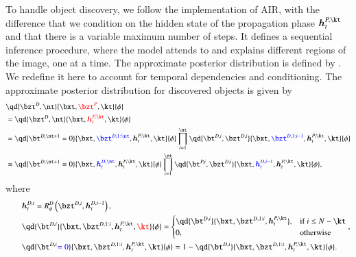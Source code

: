 To handle object discovery, we follow the implementation of AIR, with the difference that we condition on the hidden state of the propagation phase $\bm{h}_t^{P, \kt}$ and that there is a variable maximum number of steps. It defines a sequential inference procedure, where the model attends to and explains different regions of the image, one at a time. The approximate posterior distribution is defined by .
We redefine it here to account for temporal dependencies and conditioning. The approximate posterior distribution for discovered objects is given by
\begin{equation}
\begin{aligned}
    &\qd{\bzt^D, \nt}{\bxt, \textcolor{red}{\bzt^P}, \kt}{\phi}\\
%    
    &= \qd{\bzt^D, \nt}{\bxt, \textcolor{red}{\bm{h}_t^{P, \kt}}, \kt}{\phi}\\
%    
    &= \qd{\bt^{D, \nt + 1} = 0}{\bxt, \textcolor{blue}{\bzt^{D, 1:\nt}}, \bm{h}_t^{P, \kt}, \kt}{\phi} \prod_{i=1}^{\nt} \qd{\bt^{D, i}, \bzt^{D, i}}{\bxt, \textcolor{blue}{\bzt^{D,1:i-1}}, \bm{h}_t^{P, \kt}, \kt}{\phi}\\
%    
    &= \qd{\bt^{D, \nt + 1} = 0}{\bxt, \textcolor{blue}{\bm{h}_t^{D, \nt}}, \bm{h}_t^{P, \kt}, \kt}{\phi} \prod_{i=1}^{\nt} \qd{\bt^{P, i}, \bzt^{D, i}}{\bxt, \textcolor{blue}{\bm{h}_t^{D, i-1}}, \bm{h}_t^{P, \kt}, \kt}{\phi},\\
%    
%    
\end{aligned}
\end{equation}
where
\begin{equation}
\begin{aligned}
    &\qquad \bm{h}_t^{D, i} = R_\phi^D \left( \bzt^{D, i}, \bm{h}_t^{D, i-1} \right),\\
%    
    &\qquad \qd{\bt^{D, i}}{\bxt, \bzt^{D, 1:i}, \bm{h}_t^{P, \kt}, \textcolor{red}{\kt}}{\phi} = 
    \begin{cases}
        \qd{\bt^{D, i}}{\bxt, \bzt^{D, 1:i}, \bm{h}_t^{P, \kt}}, & \text{if}\ i \leq N-\kt \\
        0, & \text{otherwise}
    \end{cases},\\
%    
    &\qquad \qd{\bt^{D, i} \textcolor{blue}{= 0}}{\bxt, \bzt^{D, 1:i}, \bm{h}_t^{P, \kt}, \kt}{\phi} 
    = 1 - \qd{\bt^{D, i}}{\bxt, \bzt^{D, 1:i}, \bm{h}_t^{P, \kt}, \kt}{\phi}.
\end{aligned}
\end{equation}

